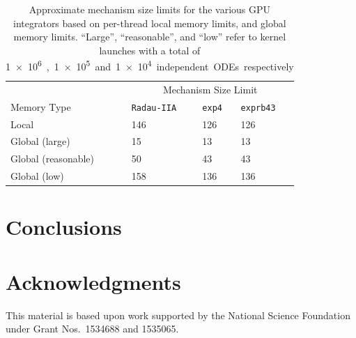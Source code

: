 \documentclass[preprint]{elsarticle}
\begin{document}
\begin{table}[h]
\centering
\begin{tabular}{@{}l l l l@{}}
 \toprule
& \multicolumn{3}{c}{Mechanism Size Limit} \\
Memory Type & \texttt{Radau-IIA} & \texttt{exp4} & \texttt{exprb43} \\
\midrule
Local	    & 146 & 126 & 126 \\

Global (large)	    & 15 & 13 & 13 \\
Global (reasonable) & 50 & 43 & 43 \\
Global (low) & 158 & 136 & 136 \\
\bottomrule
\end{tabular}
\caption{
Approximate mechanism size limits for the various GPU integrators based on per-thread local memory limits, and global memory limits.
``Large'', ``reasonable'', and ``low'' refer to kernel launches with a total of \SI{1e6}, \SI{1e5} and \SI{1e4} independent ODEs respectively
}
\label{T:size_limits}
\end{table}

\section{Conclusions}


\section*{Acknowledgments}

This material is based upon work supported by the National Science Foundation under Grant Nos.~1534688 and 1535065.


\pagebreak



\end{document}
